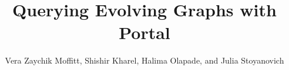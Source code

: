 \documentclass{sig-alternate}
\begin{document}
\title{Querying Evolving Graphs with Portal}

\author{
  \alignauthor Vera Zaychik Moffitt, Shishir Kharel, Halima Olapade, and Julia Stoyanovich\\
  \\
}

\maketitle

\thispagestyle{empty}












\end{document}
